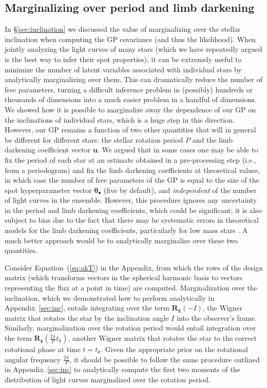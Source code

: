 \documentclass[modern]{aastex62}
\begin{document}
\pagebreak

\subsection{Marginalizing over period and limb darkening}
\label{sec:other-marg}

In \S\ref{sec:inclination} we discussed the value of marginalizing over the
stellar inclination when computing the GP covariance (and thus the likelihood).
When jointly analyzing the light curves of many stars (which we have repeatedly
argued is the best way to infer their spot properties), it can be extremely useful to
minimize the number of latent variables associated with individual stars by
analytically marginalizing over them. This can dramatically reduce the number
of free parameters, turning a difficult inference problem in (possibly) hundreds
or thousands of dimensions into a much easier problem in a handful of dimensions.
We showed how it is possible to marginalize away the dependence of our GP on
the inclinations of individual stars, which is a huge step in this direction.
However, our GP remains a function of two other quantities that will in general
be different for different stars: the stellar rotation period $P$ and the
limb darkening coefficient vector $\mathbf{u}$. We argued that in some cases
one may be able to fix the period of each star at an estimate obtained in a pre-processing
step (i.e., from a periodogram) and fix the limb darkening coefficients at
theoretical values, in which case the number of free parameters of the GP
is equal to the size of the spot hyperparameter vector $\pmb{\theta}_\bullet$
(five by default), and \emph{independent} of the number of light curves in
the ensemble.
%
However, this procedure ignores any uncertainty in the period and limb darkening
coefficients, which could be significant; it is also subject to bias due to
the fact that there may be systematic errors in theoretical models for the limb darkening
coefficients, particularly for low mass stars \citep[e.g.,][]{Kervella2017}. A much better
approach would be to analytically marginalize over these two quantities.

Consider Equation~(\ref{eq:akT}) in the Appendix, from which the rows of the
design matrix (which transforms vectors in the spherical harmonic basis to vectors
representing the flux at a point in time) are computed. Marginalization over the
inclination, which we demonstrated how to perform analytically in
Appendix~\ref{sec:inc}, entails integrating over the term
$\mathbf{R}_{\hat{\mathbf{x}}}\left(-I\right)$, the Wigner matrix that rotates
the star by the inclination angle $I$ into the observer's frame.
Similarly, marginalization over the
rotation period would entail integration over the term
$\mathbf{R}_{\hat{\mathbf{z}}}\left(\frac{2\pi}{P} t_k\right)$, another
Wigner matrix that rotates the star to the correct rotational phase at
time $t = t_k$. Given the appropriate prior on the rotational angular
frequency $\frac{2\pi}{P}$, it should be possible to follow the same
procedure outlined in Appendix~\ref{sec:inc} to analytically
compute the first two moments of the distribution of light curves marginalized over the
rotation period.
\end{document}
